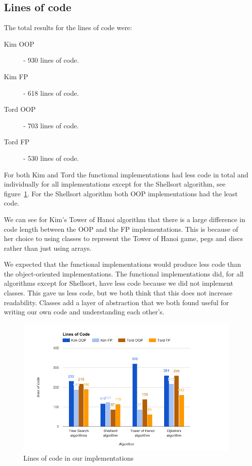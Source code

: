 \documentclass {article}
\begin{document}
\subsection{Lines of code}
The total results for the lines of code were:
\begin{description}
\item[Kim OOP] - 930 lines of code.
\item[Kim FP] - 618 lines of code.
\item[Tord OOP] - 703 lines of code.
\item[Tord FP] - 530 lines of code.
\end{description}

For both Kim and Tord the functional implementations had less code in total and individually for all implementations except for the Shellsort algorithm, see figure~\ref{fig:lines-of-code-graph}. For the Shellsort algorithm both OOP implementations had the least code. 

We can see for Kim's Tower of Hanoi algorithm that there is a large difference in code length between the OOP and the FP implementations. This is because of her choice to using classes to represent the Tower of Hanoi game, pegs and discs rather than just using arrays.

We expected that the functional implementations would produce less code than the object-oriented implementations. The functional implementations did, for all algorithms except for Shellsort, have less code because we did not implement classes. This gave us less code, but we both think that this does not increase readability. Classes add a layer of abstraction that we both found useful for writing our own code and understanding each other's.

\begin{figure}[H]
\centering
\includegraphics[width=\textwidth]{lines-of-code-graph}

\caption{Lines of code in our implementations}
\label{fig:lines-of-code-graph}
\end{figure}
\end{document}
